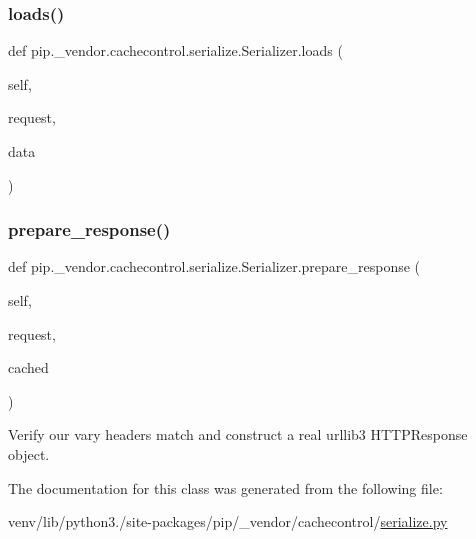 \subsubsection{\texorpdfstring{loads()}{loads()}}
{\footnotesize\ttfamily def pip.\+\_\+vendor.\+cachecontrol.\+serialize.\+Serializer.\+loads (\begin{DoxyParamCaption}\item[{}]{self,  }\item[{}]{request,  }\item[{}]{data }\end{DoxyParamCaption})}

\mbox{\label{classpip_1_1__vendor_1_1cachecontrol_1_1serialize_1_1Serializer_aa458f1b3dc76a826ab1fd071f4255d74}} 
\subsubsection{\texorpdfstring{prepare\+\_\+response()}{prepare\_response()}}
{\footnotesize\ttfamily def pip.\+\_\+vendor.\+cachecontrol.\+serialize.\+Serializer.\+prepare\+\_\+response (\begin{DoxyParamCaption}\item[{}]{self,  }\item[{}]{request,  }\item[{}]{cached }\end{DoxyParamCaption})}

\begin{DoxyVerb}Verify our vary headers match and construct a real urllib3
HTTPResponse object.
\end{DoxyVerb}
 

The documentation for this class was generated from the following file\+:\begin{DoxyCompactItemize}
\item 
venv/lib/python3./site-\/packages/pip/\+\_\+vendor/cachecontrol/\hyperlink{serialize_8py}{serialize.\+py}\end{DoxyCompactItemize}

